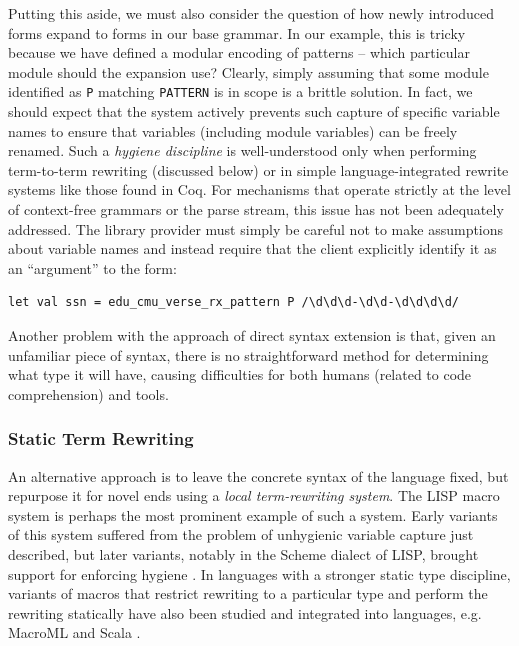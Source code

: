 Putting this aside, we must also consider the question of how newly introduced forms expand to forms in our base grammar. In our example, this is tricky because we have defined a modular encoding of patterns -- which particular module should the expansion use? Clearly, simply assuming that some module identified as \lstinline{P} matching \lstinline{PATTERN} is in scope is a brittle solution. In fact, we should expect that the system actively prevents such capture of specific variable names to ensure that variables (including module variables) can be freely renamed. Such a \emph{hygiene discipline} is well-understood only when performing term-to-term rewriting (discussed below) or in simple language-integrated rewrite systems like those found in Coq. For mechanisms that operate strictly at the level of context-free grammars or the parse stream, this issue has not been adequately addressed. The library provider must simply be careful not to make assumptions about variable names and instead require that the client explicitly identify it as an ``argument'' to the form:
\begin{lstlisting}[numbers=none]
let val ssn = edu_cmu_verse_rx_pattern P /\d\d\d-\d\d-\d\d\d\d/
\end{lstlisting}

Another problem with the approach of direct syntax extension is that, given an unfamiliar piece of syntax, there is no straightforward method for determining what type it will have, causing difficulties for both humans (related to code comprehension) and tools. 

\subsubsection{Static Term Rewriting}\label{sec:term-rewriting}
An alternative approach is to leave the concrete syntax of the language fixed, but repurpose it for novel ends using a \emph{local term-rewriting system}. The LISP macro system \cite{Hart63a} is perhaps the most prominent example of such a system. Early variants of this system suffered from the problem of unhygienic variable capture just described, but  later variants, notably in the Scheme dialect of LISP, brought support for enforcing hygiene \cite{Kohlbecker86a}. In languages with a stronger static type discipline, variants of macros that restrict rewriting to a particular type and perform the rewriting statically have also been studied \cite{Herman10:Theory,ganz2001macros} and integrated into languages, e.g. MacroML \cite{ganz2001macros} and Scala \cite{ScalaMacros2013}. 

